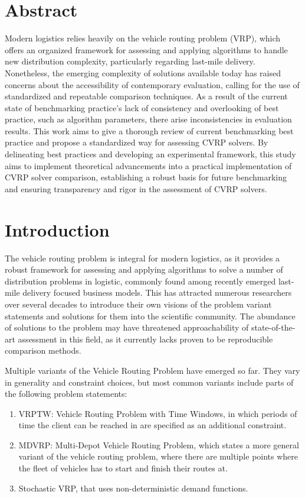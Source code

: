 \documentclass[a4paper,12pt]{report}
\begin{document}
\section{Abstract}

Modern logistics relies heavily on the vehicle routing problem (VRP), which offers an organized framework for assessing and applying algorithms to handle new distribution complexity, particularly regarding last-mile delivery. Nonetheless, the emerging complexity of solutions available today has raised concerns about the accessibility of contemporary evaluation, calling for the use of standardized and repeatable comparison techniques. As a result of the current state of benchmarking practice's lack of consistency and overlooking of best practice, such as algorithm parameters, there arise inconsistencies in evaluation results. This work aims to give a thorough review of current benchmarking best practice and propose a standardized way for assessing CVRP solvers. By delineating best practices and developing an experimental framework, this study aims to implement theoretical advancements into a practical implementation of CVRP solver comparison, establishing a robust basis for future benchmarking and ensuring transparency and rigor in the assessment of CVRP solvers.

\section{Introduction}

The vehicle routing problem is integral for modern logistics, as it provides a robust framework for assessing and applying algorithms to solve a number of distribution problems in logistic, commonly found among recently emerged last-mile delivery focused business models. This has attracted numerous researchers over several decades to introduce their own visions of the problem variant statements and solutions for them into the scientific community. The abundance of solutions to the problem may have threatened approachability of state-of-the-art assessment in this field, as it currently lacks proven to be reproducible comparison methods.

Multiple variants of the Vehicle Routing Problem have emerged so far. They vary in generality and constraint choices, but most common variants include parts of the following problem statements:

\begin{enumerate}
    \item VRPTW: Vehicle Routing Problem with Time Windows, in which periods of time the client can be reached in are specified as an additional constraint.
    \item MDVRP: Multi-Depot Vehicle Routing Problem, which states a more general variant of the vehicle routing problem, where there are multiple points where the fleet of vehicles has to start and finish their routes at.
    \item Stochastic VRP, that uses non-deterministic demand functions.
\end{enumerate}
\end{document}
